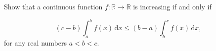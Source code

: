 Show that a continuous function $f : \mathbb{R} \to \mathbb{R}$ is increasing if and only if

\[(c - b)\int_a^b f(x)\, \text{d}x \le (b - a) \int_b^c f(x) \, \text{d}x,\]
for any real numbers $a < b < c$.
